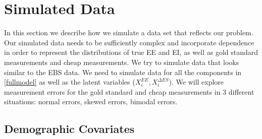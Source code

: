 \documentclass[11pt]{article}\usepackage[]{graphicx}\usepackage[]{color}
\begin{document}
% 
% 


\section{Simulated Data}

In this section we describe how we simulate a data set that reflects our problem. Our simulated data needs to be sufficiently complex and incorporate dependence in order to represent the distributions of true EE and EI, as well as gold standard measurements and cheap measurements. We try to simulate data  that looks similar to the EBS data. We need to simulate data for all the components in \eqref{fullmodel} as well as the latent variables ($X_i^{EE}, X_i^{\Delta ES}$). We will explore measurement errors for the gold standard and cheap measurements in 3 different situations: normal errors, skewed errors, bimodal errors. 

\subsection{Demographic Covariates}
\end{document}
